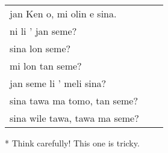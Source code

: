 \begin{supertabular}{p{5,5cm}|ll}
jan Ken o, mi olin e sina.  && \\  %
ni li ' jan seme?  && \\  %
sina lon seme?   && \\  %
mi lon tan seme?  && \\  %
jan seme li ' meli sina?   && \\    %
sina tawa ma tomo, tan seme?    && \\   %
sina wile tawa, tawa  ma seme?      && \\  %
\end{supertabular} 

* Think carefully! This one is tricky. 
